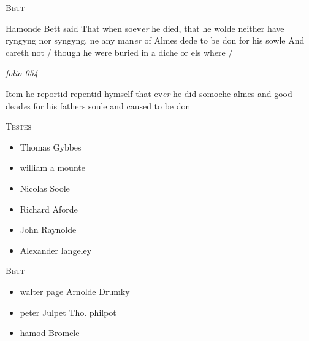 \documentclass[12pt, a4paper]{book}
\begin{document}
				\begin{center}  {\scshape Bett}  \end{center}
			
               	
               		
				\marginpar[\vspace{0.5cm}{\textcolor{Gray}{offensive}}]{}
			
               		
		\ifthenelse{\isodd{\thepage}}
		{\reversemarginpar}
		{\normalmarginpar}
		Hamonde Bett said That when soev\textit{er} he died, that
 he wolde neither have ryngyng nor syngyng, ne
 any man\textit{er} of Almes dede to be don for his sowle
 And careth not / though he were buried in a diche
 or els where /
               	



\dotfill
					

\textit{folio 054}



	
		
		\ifthenelse{\isodd{\thepage}}
		{\reversemarginpar}
		{\normalmarginpar}
		Item he reportid repentid hymself that ev\textit{er} he did
 somoche almes and good dead\textit{e}s for his fathers soule
 and caused to be don
	

	\begin{center} {\scshape Testes} \end{center}\begin{itemize}
		
		\item[]Thomas Gybbes
		\item[]william a mounte
		\item[]Nicolas Soole
		\item[]Richard Aforde
		\item[]John Raynolde
		\item[]Alexander langeley
	\end{itemize}
	
	\begin{center} {\scshape Bett} \end{center}\begin{itemize}
		
		\item[]walter page Arnolde Drumky
		\item[]peter Julpet Tho. philpot
		\item[]hamod Bromele
	\end{itemize}
\end{document}
